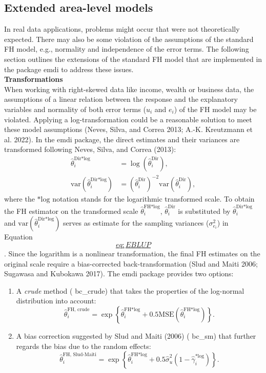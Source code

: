 \hypertarget{subsec:extfh}{%
\subsection{Extended area-level models}\label{subsec:extfh}}

In real data applications, problems might occur that were not
theoretically expected. There may also be some violation of the
assumptions of the standard FH model, e.g., normality and independence
of the error terms. The following section outlines the extensions of the
standard FH model that are implemented in the package emdi to address
these issues.\\
\textbf{Transformations}\\
When working with right-skewed data like income, wealth or business
data, the assumptions of a linear relation between the response and the
explanatory variables and normality of both error terms (\(u_i\) and
\(e_i\)) of the FH model may be violated. Applying a log-transformation
could be a reasonable solution to meet these model assumptions
(Neves, Silva, and Correa 2013; A.-K. Kreutzmann et al. 2022). In the emdi package, the direct estimates
and their variances are transformed following Neves, Silva, and Correa (2013):
\[\begin{aligned}
\hat{\theta}_{i}^{\text{Dir*log}} &=
\log\left(\hat{\theta}_{i}^{\text{Dir}}\right), \\
\text{var}\left(\hat{\theta}_{i}^{\text{Dir*log}}\right) &=
\left(\hat{\theta}_{i}^{\text{Dir}}\right)^{-2}
\text{var}\left(\hat{\theta}_{i}^{\text{Dir}}\right),
\end{aligned}\] where the \(\text{*log}\) notation stands for the
logarithmic transformed scale. To obtain the FH estimator on the
transformed scale \(\hat{\theta}_i^{\text{FH*log}}\),
\(\hat{\theta}_{i}^{\text{Dir}}\) is substituted by
\(\hat{\theta}_{i}^{\text{Dir*log}}\) and
\(\text{var}(\hat{\theta}_{i}^{\text{Dir*log}})\) serves as estimate for
the sampling variances (\(\sigma_{e_{i}}^2\)) in
Equation~\protect\hyperlink{eq:EBLUP}{\[eq:EBLUP\]}. Since the logarithm is a nonlinear
transformation, the final FH estimates on the original scale require a
bias-corrected back-transformation (Slud and Maiti 2006; Sugawasa and Kubokawa 2017). The
emdi package provides two options:

\begin{enumerate}
\def\labelenumi{\arabic{enumi}.}
\item
  A \emph{crude} method ( bc\_crude) that takes the properties of the
  log-normal distribution into account:
  \[\hat{\theta}_i^{\text{FH, crude}} = \exp \left\{ \hat{\theta}_i^{\text{FH*log}} +
      0.5 \text{MSE}\left(\hat{\theta}_i^{\text{FH*log}}\right) \right\}.\]
\item
  A bias correction suggested by Slud and Maiti (2006) ( bc\_sm) that further
  regards the bias due to the random effects:
  \[\hat{\theta}^{\text{FH, Slud-Maiti}}_{i} = \exp\left\{ \hat{\theta}^{\text{FH*log}}_{i}
      + 0.5 \hat{\sigma}_{u}^{2} \left(1 - \hat{\gamma}_{i}^{\text{*log}}\right)\right\}.\]
\end{enumerate}

